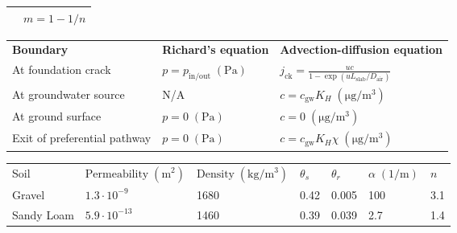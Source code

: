 \documentclass[journal=esthag,manuscript=article]{achemso}
\begin{document}
\begin{table}[htb!]
\begin{tabular}{l l}
                                  & $m = 1 - 1/n$ \\
    \bottomrule
  \end{tabular}
  \bigskip
  \begin{tabular}{l l l}
    \toprule
    \textbf{Boundary}          & \textbf{Richard's equation}      &   \textbf{Advection-diffusion equation} \\
    At foundation crack  & $p = p_\mathrm{in/out} \; \mathrm{(Pa)}$                            & $j_\mathrm{ck} = \frac{u c}{1 - \exp{(u L_\mathrm{slab}/D_\mathrm{air})}}$ \\
    At groundwater source &  N/A & $c = c_\mathrm{gw} K_H \; \mathrm{(\mu g/m^3)}$ \\
    At ground surface      & $p = 0 \; \mathrm{(Pa)}$  & $c = 0 \; \mathrm{(\mu g/m^3)}$ \\
    Exit of preferential pathway  & $p = 0 \; \mathrm{(Pa)}$  & $c = c_\mathrm{gw} K_H \chi \; \mathrm{(\mu g/m^3)}$ \\
    \bottomrule
  \end{tabular}
  \bigskip
  \begin{tabular}{l l l l l l l}
    \toprule
    Soil & $\text{Permeability} \; \mathrm{(m^2)}$  & $\mathrm{Density} \; \mathrm{(kg/m^3)}$  & $\theta_s$  & $\theta_r$  & $\alpha \; \mathrm{(1/m)}$  & $n$ \\
    Gravel     & $1.3 \cdot 10^{-9}$   & 1680    & 0.42        & 0.005       & 100       & 3.1 \\
    Sandy Loam    & $5.9 \cdot 10^{-13}$  & 1460    & 0.39        & 0.039        & 2.7       & 1.4 \\
    \bottomrule
  \end{tabular}
  \bigskip

\end{table}
\end{document}
